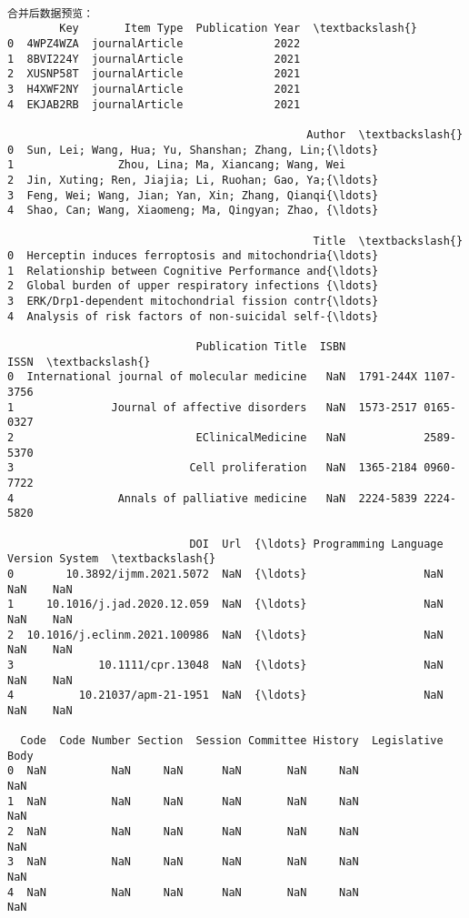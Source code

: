 \documentclass[11pt]{article}
\begin{document}
    \begin{Verbatim}[commandchars=\\\{\}]

合并后数据预览：
        Key       Item Type  Publication Year  \textbackslash{}
0  4WPZ4WZA  journalArticle              2022
1  8BVI224Y  journalArticle              2021
2  XUSNP58T  journalArticle              2021
3  H4XWF2NY  journalArticle              2021
4  EKJAB2RB  journalArticle              2021

                                              Author  \textbackslash{}
0  Sun, Lei; Wang, Hua; Yu, Shanshan; Zhang, Lin;{\ldots}
1                Zhou, Lina; Ma, Xiancang; Wang, Wei
2  Jin, Xuting; Ren, Jiajia; Li, Ruohan; Gao, Ya;{\ldots}
3  Feng, Wei; Wang, Jian; Yan, Xin; Zhang, Qianqi{\ldots}
4  Shao, Can; Wang, Xiaomeng; Ma, Qingyan; Zhao, {\ldots}

                                               Title  \textbackslash{}
0  Herceptin induces ferroptosis and mitochondria{\ldots}
1  Relationship between Cognitive Performance and{\ldots}
2  Global burden of upper respiratory infections {\ldots}
3  ERK/Drp1-dependent mitochondrial fission contr{\ldots}
4  Analysis of risk factors of non-suicidal self-{\ldots}

                             Publication Title  ISBN                 ISSN  \textbackslash{}
0  International journal of molecular medicine   NaN  1791-244X 1107-3756
1               Journal of affective disorders   NaN  1573-2517 0165-0327
2                            EClinicalMedicine   NaN            2589-5370
3                           Cell proliferation   NaN  1365-2184 0960-7722
4                Annals of palliative medicine   NaN  2224-5839 2224-5820

                            DOI  Url  {\ldots} Programming Language Version System  \textbackslash{}
0        10.3892/ijmm.2021.5072  NaN  {\ldots}                  NaN     NaN    NaN
1     10.1016/j.jad.2020.12.059  NaN  {\ldots}                  NaN     NaN    NaN
2  10.1016/j.eclinm.2021.100986  NaN  {\ldots}                  NaN     NaN    NaN
3             10.1111/cpr.13048  NaN  {\ldots}                  NaN     NaN    NaN
4          10.21037/apm-21-1951  NaN  {\ldots}                  NaN     NaN    NaN

  Code  Code Number Section  Session Committee History  Legislative Body
0  NaN          NaN     NaN      NaN       NaN     NaN               NaN
1  NaN          NaN     NaN      NaN       NaN     NaN               NaN
2  NaN          NaN     NaN      NaN       NaN     NaN               NaN
3  NaN          NaN     NaN      NaN       NaN     NaN               NaN
4  NaN          NaN     NaN      NaN       NaN     NaN               NaN


\end{Verbatim}
\end{document}

